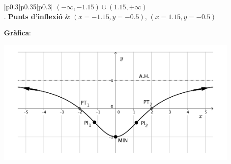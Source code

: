 \begin{center}
\begin{longtable}[h]{|p{}|p{}|p{}|}
		$(-\infty, -1.15) \cup (1.15, +\infty)$  \\  [1.5ex] . \textbf{Punts d'inflexió} &  {$(x=-1.15, y=-0.5)$, $(x=1.15, y=-0.5)$} \\  [1.5ex] \hline 
		 {\textbf{Gràfica}: 
			
			\begin{center}
				\includegraphics*[width=0.9\textwidth]{img-07/chap-deriv-racional1.pdf}
			\end{center}
		}
		\\  [1.5ex] \hline 
	\end{longtable}
\end{center}
\pagebreak

